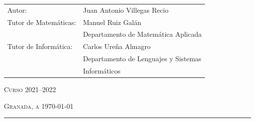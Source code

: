 \begin{titlepage}
	\vfill
	\begin{table}[h!]
			\begin{tabular}{p{}p{}}
				{\LARGE Autor:} & {\LARGE Juan Antonio Villegas Recio} \\[1cm]
				{\Large Tutor de Matemáticas:}    & {\Large Manuel Ruiz Galán} \\
				& {\Large Departamento de Matemática Aplicada} \\ [0.5cm]
				{\Large Tutor de Informática:}      & {\Large Carlos Ureña Almagro} \\
				& {\Large Departamento de Lenguajes y Sistemas} \\
				& {\Large Informáticos}
			\end{tabular}
	\end{table}
	
	\vfill
	{\Large\centering \textsc{Curso 2021--2022} \par}
	{\Large\centering \textsc{Granada, a \today} \par}
	\vspace{1cm}

	\hrule
	\vspace{0.3cm}
	
	
	
\end{titlepage}